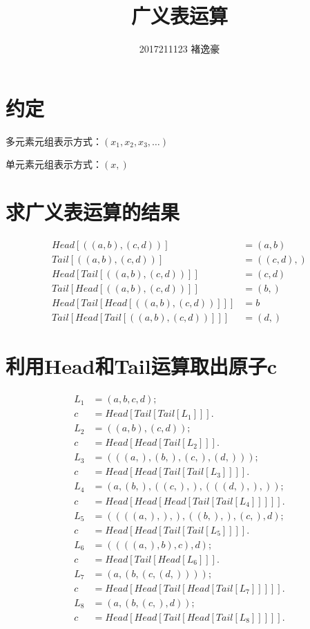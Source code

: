 \documentclass[UTF8]{ctexart}
\title{广义表运算}
\author{2017211123 褚逸豪}
\begin{document}
    \maketitle
    \begin{multicols}{2}\noindent
        \section{约定}
        多元素元组表示方式：$(x_1,x_2,x_3,\ldots)$\par
        单元素元组表示方式：$(x,)$
        \section{求广义表运算的结果}
        $$\begin{aligned}
            Head[((a,b),(c,d))]&=(a,b)\\
            Tail[((a,b),(c,d))]&=((c,d),)\\
            Head[Tail[((a,b),(c,d))]]&=(c,d)\\
            Tail[Head[((a,b),(c,d))]]&=(b,)\\
            Head[Tail[Head[((a,b),(c,d))]]]&=b\\
            Tail[Head[Tail[((a,b),(c,d))]]]&=(d,)
        \end{aligned}$$
        \section{利用Head和Tail运算取出原子c}
        $$\begin{aligned}
            L_1&=(a,b,c,d);\\
            c&=Head[Tail[Tail[L_1]]].\\
            L_2&=((a,b),(c,d));\\
            c&=Head[Head[Tail[L_2]]].\\
            L_3&=(((a,),(b,),(c,),(d,)));\\
            c&=Head[Head[Tail[Tail[L_3]]]].\\
            L_4&=(a,(b,),((c,),),(((d,),),));\\
            c&=Head[Head[Head[Tail[Tail[L_4]]]]].\\
            L_5&=((((a,),),),((b,),),(c,),d);\\
            c&=Head[Head[Tail[Tail[L_5]]]].\\
            L_6&=((((a,),b),c),d);\\
            c&=Head[Tail[Head[L_6]]].\\
            L_7&=(a,(b,(c,(d,))));\\
            c&=Head[Head[Tail[Head[Tail[L_7]]]]].\\
            L_8&=(a,(b,(c,),d));\\
            c&=Head[Head[Tail[Head[Tail[L_8]]]]].
        \end{aligned}$$    
    \end{multicols}
    
\end{document}
